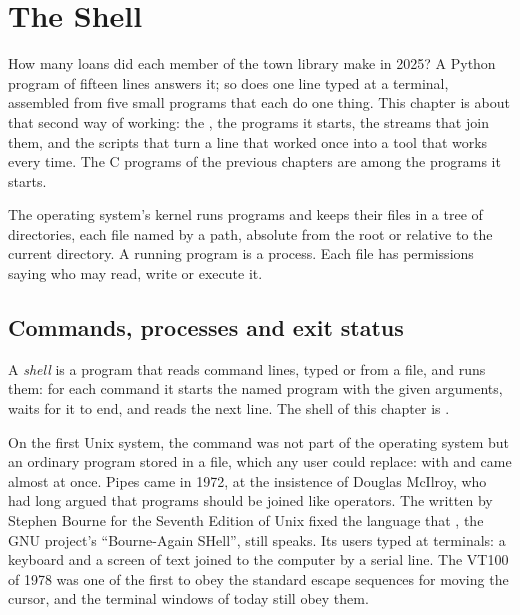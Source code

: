 \chapter{The Shell}\label{ch:b1:the-shell}

How many loans did each member of the town library make in 2025? A Python program of fifteen lines answers it; so does
one line typed at a terminal, assembled from five small programs that each do one thing. This chapter is about that
second way of working: the , the programs it starts, the streams that join them, and the scripts that turn a
line that worked once into a tool that works every time. The C programs of the previous chapters are among the
programs it starts.

\begin{recall}
The operating system's kernel runs programs and keeps their files in a tree of directories, each file named by a
path, absolute from the root \code{/} or relative to the current directory. A running program is a process. Each file
has permissions saying who may read, write or execute it.
\end{recall}

\section{Commands, processes and exit status}\label{sec:b1:the-shell:commands}

\begin{definition}[Shell]\label{def:b1:the-shell:shell}
A \emph{shell} is a program that reads command lines, typed or from a file, and runs them: for each
command it starts the named program with the given arguments, waits for it to end, and reads the next line. The shell
of this chapter is .
\end{definition}

\begin{history}
On the first Unix system, the command  was not part of the operating system but an ordinary program
stored in a file, which any user could replace:  with \code{<} and \code{>} came almost at once. Pipes came
in 1972, at the insistence of Douglas McIlroy, who had long argued that programs should be joined like operators.
The  written by Stephen Bourne for the Seventh Edition of Unix fixed the language that , the GNU
project's ``Bourne-Again SHell'', still speaks.
Its users typed at terminals: a keyboard and a screen of text joined to the computer by a serial line. The VT100 of
1978 was one of the first to obey the standard escape sequences for moving the cursor, and the terminal windows of
today still obey them.
\end{history}

